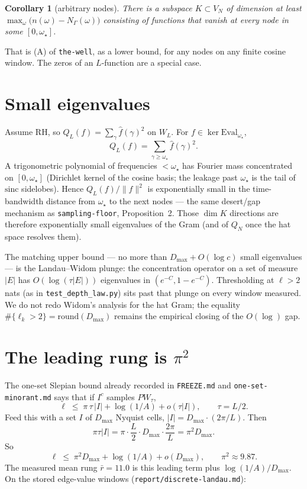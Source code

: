 \documentclass[11pt]{article}
\newtheorem{corollary}[lemma]{Corollary}
\theoremstyle{remark}\newtheorem*{remark}{Remark}
\begin{document}
\begin{corollary}[arbitrary nodes]
\label{cor:D}
There is a subspace $K\subset V_N$ of dimension at least
$\max_\omega\bigl(n(\omega)-N_\Gamma(\omega)\bigr)$ consisting of
functions that vanish at every node in some $[0,\omega_\star]$.
\end{corollary}

That is (A) of \texttt{the-well}, as a lower bound, for any nodes on any
finite cosine window. The zeros of an $L$-function are a special case.

\section{Small eigenvalues}
Assume RH, so $Q_L(f)=\sum_\gamma\hat f(\gamma)^2$ on $W_L$. For
$f\in\ker\mathrm{Eval}_{\omega_\star}$,
\[
Q_L(f)
=\sum_{\gamma\ge\omega_\star}\hat f(\gamma)^2.
\]
A trigonometric polynomial of frequencies ${<}\omega_\star$ has Fourier
mass concentrated on $[0,\omega_\star]$ (Dirichlet kernel of the cosine
basis; the leakage past $\omega_\star$ is the tail of $\mathrm{sinc}$
sidelobes). Hence $Q_L(f)/\|f\|^2$ is exponentially small in the
time-bandwidth distance from $\omega_\star$ to the next nodes --- the
same desert/gap mechanism as \texttt{sampling-floor}, Proposition~2.
Those $\dim K$ directions are therefore exponentially small eigenvalues
of the Gram (and of $Q_N$ once the hat space resolves them).

The matching upper bound --- no more than $D_{\max}+O(\log c)$ small
eigenvalues --- is the Landau--Widom plunge: the concentration operator
on a set of measure $|E|$ has $O(\log(\tau|E|))$ eigenvalues in
$(e^{-C},1-e^{-C})$. Thresholding at $\ell>2$ nats (as in
\texttt{test\_depth\_law.py}) sits past that plunge on every window
measured. We do not redo Widom's analysis for the hat Gram; the
equality $\#\{\ell_k>2\}=\mathrm{round}(D_{\max})$ remains the
empirical closing of the $O(\log)$ gap.

\section{The leading rung is $\pi^2$}
The one-set Slepian bound already recorded in \texttt{FREEZE.md} and
\texttt{one-set-minorant.md} says that if $I^c$ samples $PW_\tau$,
\[
\ell
\;\le\;
\pi\,\tau\,|I|+\log(1/A)+o(\tau|I|),
\qquad \tau=L/2.
\]
Feed this with a set $I$ of $D_{\max}$ Nyquist cells,
$|I|=D_{\max}\cdot(2\pi/L)$. Then
\[
\pi\tau|I|
=\pi\cdot\frac L2\cdot D_{\max}\cdot\frac{2\pi}L
=\pi^2 D_{\max}.
\]
So
\begin{equation}
\label{eq:pi2}
\ell
\;\le\;
\pi^2 D_{\max}+\log(1/A)+o(D_{\max}),
\qquad
\pi^2\approx 9.87.
\end{equation}
The measured mean rung $\bar r=11.0$ is this leading term plus
$\log(1/A)/D_{\max}$. On the stored edge-value windows
(\texttt{report/discrete-landau.md}):
\end{document}
